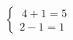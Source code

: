 \documentclass[preview]{standalone}
\begin{document}
\begin{align*}
\left\{ \begin{array}{cl} \ 4   + 1= 5 \\[1pt] 2 - 1 = 1 \end{array} \right.
\end{align*}
\end{document}
